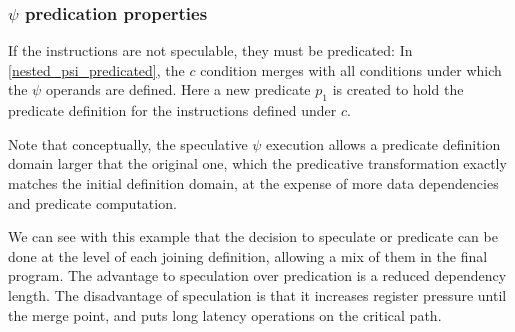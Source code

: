 \subsubsection{$\psi$ predication properties}

If the instructions are not speculable, they must be predicated:
In \ref{nested_psi_predicated}, the $c$ condition merges with all conditions under which the $\psi$ operands are defined. Here a new predicate $p_1$ is created to hold the predicate definition for the instructions defined under $c$. 

Note that conceptually, the speculative $\psi$ execution allows a predicate definition domain larger that the original one, which the predicative transformation exactly matches the initial definition domain, at the expense of more data dependencies and predicate computation.

We can see with this example that the decision to speculate or predicate can be done at the level of each joining definition, allowing a mix of them in the final program. The advantage to speculation over predication is a reduced dependency length. The disadvantage of speculation is that it increases register pressure until the merge point, and puts long latency operations on the critical path.
 
